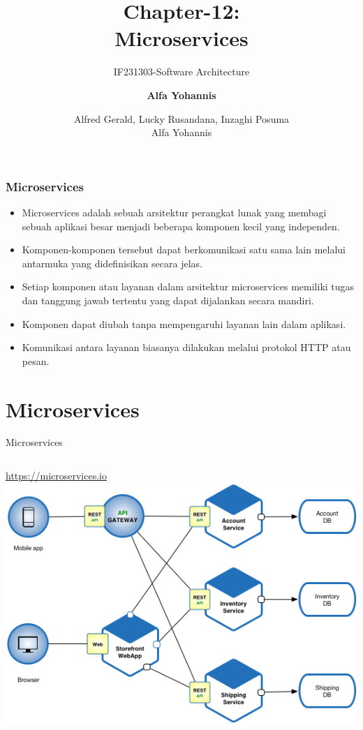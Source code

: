 \documentclass[aspectratio=169, table]{beamer}
\subtitle{IF231303-Software Architecture}
\author[Pradita]{\small {\textbf{Alfa Yohannis}}}
\title{\huge Chapter-12:\\Microservices}
\author{Alfred Gerald, Lucky Rusandana, Inzaghi Posuma\\Alfa Yohannis}
\begin{document}
    \frame{\titlepage}

    \begin{frame}
        \frametitle{Microservices}
        \vspace{25pt}
        \begin{itemize}
            \item Microservices adalah sebuah arsitektur perangkat lunak yang membagi sebuah aplikasi besar menjadi beberapa komponen kecil yang independen.
            \item Komponen-komponen tersebut dapat berkomunikasi satu sama lain melalui antarmuka yang didefinisikan secara jelas.
            \item Setiap komponen atau layanan dalam arsitektur microservices memiliki tugas dan tanggung jawab tertentu yang dapat dijalankan secara mandiri.
            \item Komponen dapat diubah tanpa mempengaruhi layanan lain dalam aplikasi.
            \item Komunikasi antara layanan biasanya dilakukan melalui protokol HTTP atau pesan.
        \end{itemize}
    \end{frame}

    \section{Microservices}
    \begin{frame}{Microservices}
        \vspace{30pt}
        \begin{columns}
            \url{https://microservices.io}
                    \includegraphics[width=\textwidth]{../../images/Microservice_Architecture}
        \end{columns}
    \end{frame}
\end{document}
